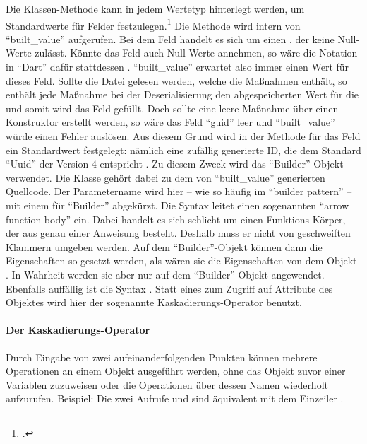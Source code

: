 Die Klassen-Methode  kann in jedem Wertetyp hinterlegt werden, um Standardwerte für Felder festzulegen.\footcite[Vgl.][]{BuiltValueChangelog}
Die Methode wird intern von \enquote{built_value} aufgerufen.
Bei dem Feld  handelt es sich um einen , der keine Null-Werte zulässt.
Könnte das Feld auch Null-Werte annehmen, so wäre die Notation in \enquote{Dart} dafür stattdessen . \enquote{built_value} erwartet also immer einen Wert für dieses Feld.
Sollte die Datei gelesen werden,
welche die Maßnahmen enthält, so enthält jede Maßnahme bei der Deserialisierung den abgespeicherten Wert für die  und somit wird das Feld gefüllt.
Doch sollte eine leere Maßnahme über einen Konstruktor erstellt werden, so wäre das Feld \enquote{guid} leer und \enquote{built_value} würde einen Fehler auslösen.
Aus diesem Grund wird in der Methode  für das Feld  ein Standardwert festgelegt: nämlich eine zufällig generierte ID,
die dem Standard \enquote{Uuid} der Version 4 entspricht .
Zu diesem Zweck wird das \enquote{Builder}-Objekt verwendet.
Die Klasse  gehört dabei zu dem von \enquote{built_value} generierten Quellcode.
Der Parametername wird hier -- wie so häufig im \enquote{builder pattern} -- mit einem  für \enquote{Builder} abgekürzt.
Die Syntax \IC{=>} leitet  einen sogenannten \enquote{arrow function body} ein.
Dabei handelt es sich schlicht um einen Funktions-Körper, der aus genau einer Anweisung besteht.
Deshalb muss er nicht von geschweiften Klammern umgeben werden.
Auf dem \enquote{Builder}-Objekt können dann die Eigenschaften so gesetzt werden, als wären sie die Eigenschaften von dem Objekt .
In Wahrheit werden sie aber nur auf dem \enquote{Builder}-Objekt angewendet.
Ebenfalls auffällig ist die Syntax .
Statt eines  zum Zugriff auf Attribute des Objektes wird hier der sogenannte Kaskadierungs-Operator  benutzt.

\paragraph{Der Kaskadierungs-Operator}

Durch Eingabe von zwei aufeinanderfolgenden Punkten  können mehrere Operationen an einem Objekt ausgeführt werden,
ohne das Objekt zuvor einer Variablen zuzuweisen oder die Operationen über dessen Namen wiederholt aufzurufen.
Beispiel: Die zwei Aufrufe  und  sind äquivalent mit dem Einzeiler .

